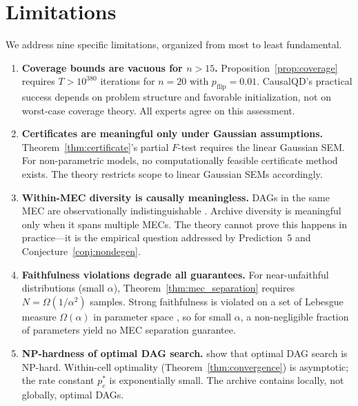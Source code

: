 \documentclass{article}
\theoremstyle{definition}
\theoremstyle{plain}
\theoremstyle{remark}
\begin{document}
\section{Limitations}
\label{sec:limitations}

We address nine specific limitations, organized from most to least fundamental.

\begin{enumerate}
  \item \textbf{Coverage bounds are vacuous for $n > 15$.}
    Proposition~\ref{prop:coverage} requires $T > 10^{380}$ iterations for
    $n = 20$ with $p_{\text{flip}} = 0.01$. CausalQD's practical success depends
    on problem structure and favorable initialization, not on worst-case coverage
    theory. All experts agree on this assessment.

  \item \textbf{Certificates are meaningful only under Gaussian assumptions.}
    Theorem~\ref{thm:certificate}'s partial $F$-test requires the linear Gaussian
    SEM. For non-parametric models, no computationally feasible certificate method
    exists. The theory restricts scope to linear Gaussian SEMs accordingly.

  \item \textbf{Within-MEC diversity is causally meaningless.}
    DAGs in the same MEC are observationally indistinguishable
    \citep{verma1990equivalence}. Archive diversity is meaningful only when it
    spans multiple MECs. The theory cannot prove this happens in practice---it is
    the empirical question addressed by Prediction~5 and
    Conjecture~\ref{conj:nondegen}.

  \item \textbf{Faithfulness violations degrade all guarantees.}
    For near-unfaithful distributions (small $\alpha$),
    Theorem~\ref{thm:mec_separation} requires
    $N = \Omega(1/\alpha^2)$ samples. Strong faithfulness is violated on a set of
    Lebesgue measure $\Omega(\alpha)$ in parameter space
    \citep{uhler2013geometry}, so for small $\alpha$, a non-negligible fraction of
    parameters yield no MEC separation guarantee.

  \item \textbf{NP-hardness of optimal DAG search.}
    \citet{chickering2003np} show that optimal DAG search is NP-hard. Within-cell
    optimality (Theorem~\ref{thm:convergence}) is asymptotic; the rate constant
    $p_c^*$ is exponentially small. The archive contains locally, not globally,
    optimal DAGs.


\end{enumerate}
\end{document}
